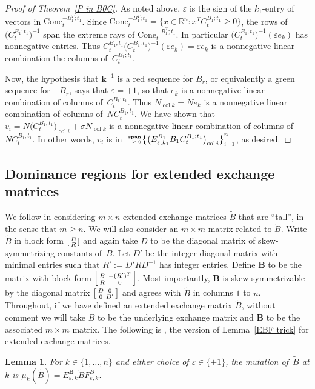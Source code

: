 \documentclass[10pt]{article}
\newtheorem{lemma}[proposition]{Lemma}
\theoremstyle{definition}
\theoremstyle{remark}
\numberwithin{equation}{section}
\newcommand{\reals}{\mathbb R}
\newcommand{\ep}{\varepsilon}
\newcommand{\col}{\operatorname{col}}
\newcommand{\nnspan}{{\!\!\tiny\begin{array}{r}\mathbf{span}\\\ge0\end{array}\hspace*{-0.57em}}}
\newcommand{\set}[1]{{\lbrace #1 \rbrace}}
\newcommand{\sett}[1]{{\bigl\lbrace #1 \bigr\rbrace}}
\newcommand{\0}{{\mathbf{0}}}
\newcommand{\Cone}{\mathrm{Cone}}
\newcommand{\kk}{{\boldsymbol{k}}}
\newcommand{\tB}{{\widetilde{B}}}
\newcommand{\BB}{\mathbf{B}}
\newcommand{\R}{\mathcal{R}}
\newcommand{\symmetrizer}{{D}}
\begin{document}
\begin{proof}[Proof of Theorem~\ref{P in B0C}]
As noted above, $\ep$ is the sign of the $k_1$-entry of vectors in $\Cone_t^{-B_1^T;t_1}$.
Since $\Cone^{-B_1^T;t_1}_t=\set{x\in\reals^n:x^TC_t^{B_1;t_1}\ge0}$, the rows of $\bigl(C_t^{B_1;t_1}\bigr)^{-1}$ span the extreme rays of $\Cone_t^{-B_1^T;t_1}$.
In particular $\bigl(C_t^{B_1;t_1}\bigr)^{-1}(\ep e_k)$ has nonnegative entries.
Thus $C_t^{B_1;t_1}\bigl(C_t^{B_1;t_1}\bigr)^{-1}(\ep e_k)=\ep e_k$ is a nonnegative linear combination the columns of~$C_t^{B_1;t_1}$.

Now, the hypothesis that $\kk^{-1}$ is a red sequence for $B_r$, or equivalently a green sequence for $-B_r$, says that $\ep=+1$, so that $e_k$ is a nonnegative linear combination of columns of~$C_t^{B_1;t_1}$.
Thus $N_{\col k}=Ne_k$ is a nonnegative linear combination of columns of~$NC_t^{B_1;t_1}$.
We have shown that $v_i=N\bigl(C_t^{B_1;t_1}\bigr)_{\col i}+\sigma N_{\col k}$ is a nonnegative linear combination of columns of~$NC_t^{B_1;t_1}$.
In other words, $v_i$ is in~$\nnspan\sett{\bigl(E^{B_1}_{\ep,k_1}B_1C_t^{B_1;t_1}\bigr)_{\col i}}_{i=1}^n$, as desired.
\end{proof}

\subsection{Dominance regions for extended exchange matrices}\label{ext sec}
We follow \cite{ca4} in considering $m\times n$ extended exchange matrices $\tB$ that are ``tall'', in the sense that $m\ge n$.
We will also consider an $m\times m$ matrix related to $\tB$.
Write $\tB$ in block form $\begin{bsmallmatrix}B\\R\end{bsmallmatrix}$ and again take $\symmetrizer$ to be the diagonal matrix of skew-symmetrizing constants of~$B$.
Let $\symmetrizer'$ be the integer diagonal matrix with minimal entries such that $R':=\symmetrizer'R\symmetrizer^{-1}$ has integer entries.
Define $\BB$ to be the matrix with block form $\begin{bsmallmatrix}B\,&-(R')^T\\R\,&0\end{bsmallmatrix}$.
Most importantly, $\BB$ is skew-symmetrizable by the diagonal matrix $\begin{bsmallmatrix}\symmetrizer&0\\0&\symmetrizer'\end{bsmallmatrix}$ and agrees with $\tB$ in columns $1$ to $n$.
  Throughout, if we have defined an extended exchange matrix $\tB$, without comment we will take $B$ to be the underlying exchange matrix and $\BB$ to be the associated $m\times m$ matrix.
The following is \cite[(3.2)]{ca3}, the version of Lemma~\ref{EBF trick} for extended exchange matrices.
\begin{lemma}\label{EBF trick ext}
For $k\in\set{1,\ldots,n}$ and either choice of $\ep\in\set{\pm1}$, the mutation of~$\tB$ at $k$ is $\mu_k(\tB)=E_{\ep,k}^\BB \tB F_{\ep,k}^B$.
\end{lemma}
\end{document}
